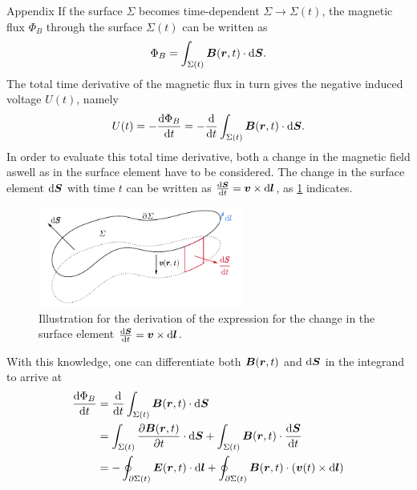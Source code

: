 \documentclass{beamer}
\begin{document}
\begin{frame}[allowframebreaks]{Appendix}
  \pagebreak
 If the surface $\Sigma$ becomes time-dependent $\Sigma \rightarrow \Sigma(t)$, the magnetic flux $\Phi_B$ through the surface $\Sigma(t)$ can be written as \begin{equation}
		\Phi_B = \int_{\Sigma(t)} \bm{B}(\bm{r},t)\cdot \mathrm{d}\bm{S}.
	\end{equation} The total time derivative of the magnetic flux in turn gives the negative induced voltage $U(t)$, namely \begin{equation}
	U(t) = -\frac{\mathrm{d}\Phi_B}{\mathrm{d}t} = -\frac{\mathrm{d}}{\mathrm{d}t} \int_{\Sigma(t)} \bm{B}(\bm{r},t)\cdot \mathrm{d}\bm{S}.
	\end{equation} In order to evaluate this total time derivative, both a change in the magnetic field aswell as in the surface element have to be considered. The change in the surface element $\mathrm{d}\bm{S}$ with time $t$ can be written as $\tfrac{\mathrm{d}\bm{S}}{\mathrm{d}t} = \bm{v} \times \mathrm{d}\bm{l}$, as \cref{fig:changeinsurfaceelement} indicates.
	\begin{figure}[h]
		\centering
		\includegraphics[width=0.6\textwidth]{figures/changeinsurfaceelement}
		\caption{Illustration for the derivation of the expression for the change in the surface element $\tfrac{\mathrm{d}\bm{S}}{\mathrm{d}t} = \bm{v} \times \mathrm{d}\bm{l}$.}
		\label{fig:changeinsurfaceelement}
	\end{figure}
	With this knowledge, one can differentiate both $\bm{B}(\bm{r},t)$ and $\mathrm{d}\bm{S}$ in the integrand to arrive at \begin{align}
		\begin{aligned}
			\frac{\mathrm{d}\Phi_B}{\mathrm{d}t} &= \frac{\mathrm{d}}{\mathrm{d}t} \int_{\Sigma(t)}\vect{B}(\vect{r},t)\cdot \mathrm{d}\vect{S} \\
			&= \int_{\Sigma(t)}\frac{\partial \vect{B}(\vect{r},t)}{\partial t}\cdot \mathrm{d}\vect{S} + \int_{\Sigma(t)}\vect{B}(\vect{r},t)\cdot \frac{\mathrm{d}\vect{S}}{\mathrm{d}t} \\
			&= - \oint_{\partial \Sigma(t)} \vect{E}(\vect{r},t)\cdot \mathrm{d}\vect{l} + \oint_{\partial \Sigma(t)}\vect{B}(\vect{r},t)\cdot (\vect{v}(t)\times \mathrm{d}\vect{l}) \\

\end{aligned}
\end{align}
\end{frame}
\end{document}
